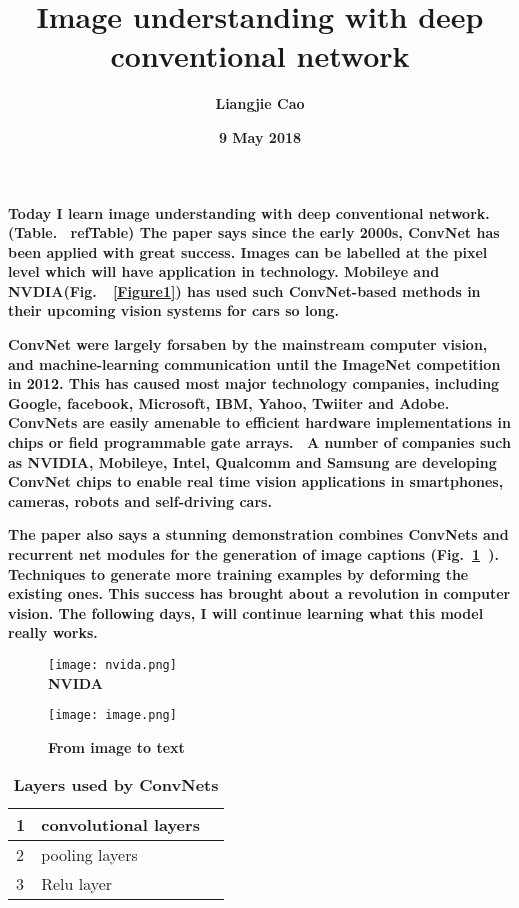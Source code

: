 \documentclass[35pt]{article}
\begin{document}
\title{\textbf{Image understanding with deep conventional network}}
\author{\textbf{Liangjie Cao}}
\date{\textbf{9 May 2018}}
\maketitle
\par
\textbf{Today I learn image understanding with deep conventional network.(Table. ~ref{Table}) The paper says since the early 2000s, ConvNet has been applied with great success. Images can be labelled at the pixel level which will have application in technology. Mobileye and NVDIA(Fig. ~\ref{Figure1}) has used such ConvNet-based methods in their upcoming vision systems for cars so long.}\\
\par
\textbf{ConvNet were largely forsaben by the mainstream computer vision, and machine-learning communication until the ImageNet competition in 2012. This has caused most major technology companies, including Google, facebook, Microsoft, IBM, Yahoo, Twiiter and Adobe. ConvNets are easily amenable to efficient hardware implementations in chips or field programmable gate arrays.~\cite{name2} A number of companies such as NVIDIA, Mobileye, Intel, Qualcomm and Samsung are developing ConvNet chips to enable real time vision applications in smartphones, cameras, robots and self-driving cars.~\cite{name1}}
\\
\par
\textbf{The paper also says a stunning demonstration combines ConvNets and recurrent net modules for the generation of image captions (Fig.~\ref{Figure2} ). Techniques to generate more training examples by deforming the existing ones. This success has brought about a revolution in computer vision. The following days, I will continue learning what this model really works.}\\
\onecolumn
 \begin{figure}[ht]
 \centering
 \texttt{[image: nvida.png]}\\
 \caption{\textbf{NVIDA}}\label{Figure1}
 \centering
 \texttt{[image: image.png]}\\
 \caption{\textbf{From image to text}}\label{Figure2}
\end{figure}
\begin{table}[!htbp]
  \centering
 \begin{tabular}{|p{2cm}|p{2cm}|p{2cm}}
   \hline
     1 & convolutional layers\\
  \hline
     2 & pooling layers\\
   \hline
   3 & Relu layer \\
   \hline
  \end{tabular}
  \caption{\textbf{Layers used by ConvNets}} \label{Table}
  \end{table}


\end{document}
